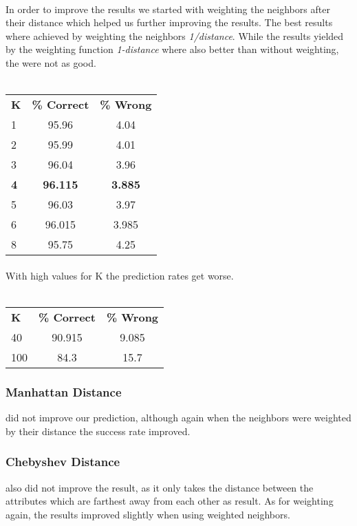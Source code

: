 \documentclass{article}
\begin{document}
\paragraph{}In order to improve the results we started with weighting the neighbors after their distance which helped us further improving the results. The best results where achieved by weighting the neighbors \emph{1/distance}. While the results yielded by the weighting function \emph{1-distance} where also better than without weighting, the were not as good.
\\\\
\begin{tabular}{ l | c | c }
\textbf{K} & \textbf{\% Correct} & \textbf{\% Wrong} \\
1 & 95.96 & 4.04 \\
2 & 95.99& 4.01\\
3 & 96.04 & 3.96 \\
\textbf{4} & \textbf{96.115} & \textbf{3.885} \\
5 & 96.03 & 3.97 \\
6 & 96.015 & 3.985 \\
8 & 95.75 & 4.25 \\
\end{tabular}
\paragraph{}With high values for K the prediction rates get worse. 
\\\\
\begin{tabular}{ l | c | c }
\textbf{K} & \textbf{\% Correct} & \textbf{\% Wrong} \\
40 & 90.915 & 9.085 \\
100 &  84.3 & 15.7 \\
\end{tabular}
\subsubsection{Manhattan Distance} did not improve our prediction, although again when the neighbors were weighted by their distance the success rate improved.
\subsubsection{Chebyshev Distance} also did not improve the result, as it only takes the distance between the attributes which are farthest away from each other as result. As for weighting again, the results improved slightly when using weighted neighbors.
\end{document}
